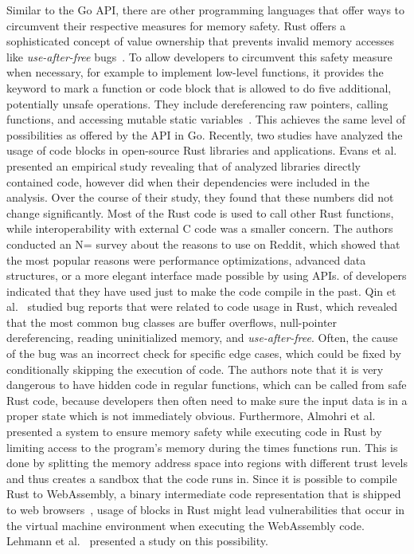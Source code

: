 Similar to the Go \unsafe{} \acrshort{API}, there are other programming languages that offer ways to circumvent their
respective measures for memory safety.
Rust offers a sophisticated concept of value ownership that prevents invalid memory accesses like
\textit{use-after-free} bugs~\cite{matsakis2014}.
To allow developers to circumvent this safety measure when necessary, for example to implement low-level functions, it
provides the \unsafe{} keyword to mark a function or code block that is allowed to do five additional, potentially
unsafe operations.
They include dereferencing raw pointers, calling \unsafe{} functions, and accessing mutable static
variables~\cite{matsakis2014}.
This achieves the same level of possibilities as offered by the \unsafe{} \acrshort{API} in Go.
Recently, two studies have analyzed the usage of \unsafe{} code blocks in open-source Rust libraries and applications.
Evans et al.~\cite{evans2020} presented an empirical study revealing that  of analyzed
libraries directly contained \unsafe{} code, however  did when their dependencies were included
in the analysis.
Over the course of their  study, they found that these numbers did not change significantly.
Most of the \unsafe{} Rust code is used to call other Rust functions, while interoperability with external C code was a
smaller concern.
The authors conducted an N= survey about the reasons to use \unsafe{} on Reddit, which showed that the most
popular reasons were performance optimizations, advanced data structures, or a more elegant interface made possible by
using \unsafe{} \acrshort{API}s.
 of developers indicated that they have used \unsafe{} just to make the code compile in the past.
Qin et al.~\cite{qin2020} studied bug reports that were related to \unsafe{} code usage in Rust, which revealed that the
most common bug classes are buffer overflows, null-pointer dereferencing, reading uninitialized memory, and
\textit{use-after-free}.
Often, the cause of the bug was an incorrect check for specific edge cases, which could be fixed by conditionally
skipping the execution of \unsafe{} code.
The authors note that it is very dangerous to have hidden \unsafe{} code in regular functions, which can be called from
safe Rust code, because developers then often need to make sure the input data is in a proper state which is not
immediately obvious.
Furthermore, Almohri et al.~\cite{almohri2018} presented a system to ensure memory safety while executing \unsafe{} code
in Rust by limiting access to the program's memory during the times \unsafe{} functions run.
This is done by splitting the memory address space into regions with different trust levels and thus creates a sandbox
that the \unsafe{} code runs in.
Since it is possible to compile Rust to WebAssembly, a binary intermediate code representation that is shipped to web
browsers~\cite{rourke2018}, usage of \unsafe{} blocks in Rust might lead vulnerabilities that occur in the virtual
machine environment when executing the WebAssembly code.
Lehmann et al.~\cite{lehmann2020} presented a study on this possibility.

